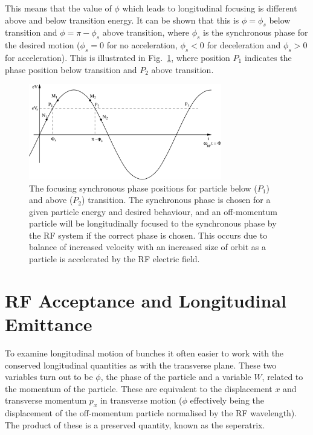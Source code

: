 This means that the value of $\phi$ which leads to longitudinal focusing is different above and below transition energy. It can be shown that this is $\phi = \phi_{s}$ below transition and $\phi = \pi - \phi_{s}$ above transition, where $\phi_{s}$ is the synchronous phase for the desired motion ($\phi_{s} = 0$ for no acceleration, $\phi_{s} < 0$ for deceleration and $\phi_{s} > 0$ for acceleration). This is illustrated in Fig.~\ref{fig:longPhase}, where position $P_{1}$ indicates the phase position below transition and $P_{2}$ above transition.

\begin{figure}
\begin{center}
\includegraphics[width=0.75\textwidth]{appendices/figures/longStab.png}
\end{center}
\caption{The focusing synchronous phase positions for particle below ($P_{1}$) and above ($P_{2}$) transition. The synchronous phase is chosen for a given particle energy and desired behaviour, and an off-momentum particle will be longitudinally focused to the synchronous phase by the RF system if the correct phase is chosen. This occurs due to balance of increased velocity with an increased size of orbit as a particle is accelerated by the RF electric field.}
\label{fig:longPhase}
\end{figure}

\section{RF Acceptance and Longitudinal Emittance}

To examine longitudinal motion of bunches it often easier to work with the conserved longitudinal quantities as with the transverse plane. These two variables turn out to be $\phi$, the phase of the particle and a variable $W$, related to the momentum of the particle. These are equivalent to the displacement $x$ and transverse momentum $p_{x}$ in transverse motion ($\phi$ effectively being the displacement of the off-momentum particle normalised by the RF wavelength). The product of these is a preserved quantity, known as the seperatrix.

